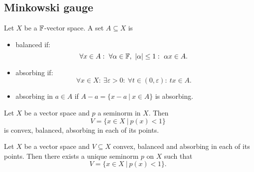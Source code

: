 \subsection{Minkowski gauge}


\begin{definition}
  Let $X$ be a $\mathbb {F}$-vector space. A set $A \subseteq X$ is 
  \begin{itemize}
    \item balanced if:
    $$\forall x \in A:\ \forall \alpha \in \F,\ |\alpha| \leq 1:\ \alpha x \in A.$$
    \item absorbing if:
    $$\forall x \in X:\ \exists \varepsilon > 0:\ \forall t \in (0, \varepsilon):\ tx \in A.$$
    \item absorbing in $a \in A$ if $A - a = \{x - a\ |\ x \in A\}$ is absorbing.
  \end{itemize}
\end{definition}

\begin{example}
  Let $X$ be a vector space and $p$ a seminorm in $X$. Then 
  $$V = \{x \in X\ |\ p(x) < 1\}$$
  is convex, balanced, absorbing in each of its points.
\end{example}

\begin{theorem}
  Let $X$ be a vector space and $V \subseteq X$ convex, balanced and absorbing in each of its points.
  Then there exists a unique seminorm $p$ on $X$ such that 
  $$V = \{x \in X\ |\ p(x) < 1\}.$$
\end{theorem}

